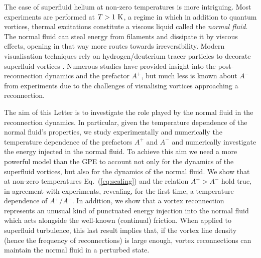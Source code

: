 \documentclass[9pt,twocolumn,twoside]{pnas-new}
\begin{document}
The case of superfluid helium at non-zero temperatures
is more intriguing. Most experiments are performed at $T>1~\rm K$, a regime in which in addition to quantum vortices, thermal excitations constitute a viscous liquid called the {\it normal fluid}. The normal fluid can steal energy from filaments and dissipate it by viscous effects, opening in that way more routes towards irreversibility. Modern visualisation techniques rely on hydrogen/deuterium tracer particles to decorate superfluid vortices \cite{paoletti2008velocity,bewley2008,guo2014visualization,perettiDirectVisualizationQuantum2023}. Numerous studies have provided insight into the post-reconnection dynamics and the prefactor $A^{+}$, but much less is known about $A^-$ from experiments due to the challenges of visualising vortices approaching a reconnection.

The aim of this Letter is to investigate the role played by the normal fluid in the reconnection dynamics. In particular, given the temperature dependence of the normal fluid's properties, we study experimentally and numerically the temperature dependence of the prefactors $A^+$ and $A^-$ and numerically investigate the energy injected in the normal fluid. 
%
To achieve this aim we need a more powerful model than the GPE to account not only for the dynamics of the
superfluid vortices, but also for the dynamics of the normal fluid. 
We show that at non-zero temperatures Eq.~(\ref{eq:scaling}) and the
relation $A^+>A^-$ hold true, in agreement with experiments, revealing, for the 
first time, a temperature dependence of $A^+/A^-$. In addition, we
show that a vortex
reconnection represents an unusual kind of
punctuated energy injection into the normal fluid which acts alongside
the well-known (continual) friction.
When applied to superfluid turbulence, this last result implies that,
if the vortex line density (hence the frequency of reconnections) 
is large enough, vortex
reconnections can maintain the normal fluid in a perturbed state.

\end{document}
